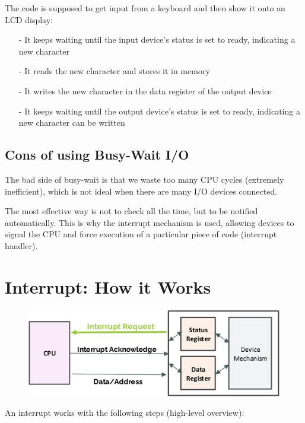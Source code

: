 The code is supposed to get input from a keyboard and then show it onto an LCD display:

\begin{itemize}
    \item[-] It keeps waiting until the input device's status is set to ready, indicating a new character
    \item[-] It reads the new character and stores it in memory
    \item[-] It writes the new character in the data register of the output device
    \item[-] It keeps waiting until the output device's status is set to ready, indicating a new character can be written
\end{itemize}

\subsection{Cons of using Busy-Wait I/O}

The bad side of busy-wait is that we waste too many CPU cycles (extremely inefficient), which is not
ideal when there are many I/O devices connected.

The most effective way is not to check all the time, but to be notified automatically. This is why the
interrupt mechanism is used, allowing devices to signal the CPU and force execution of a
particular piece of code (interrupt handler).


\section{Interrupt: How it Works}

\begin{figure}[H]
    \centering
    \includegraphics[width=0.65\linewidth]{img/image43.png}
\end{figure}

An interrupt works with the following steps (high-level overview):

